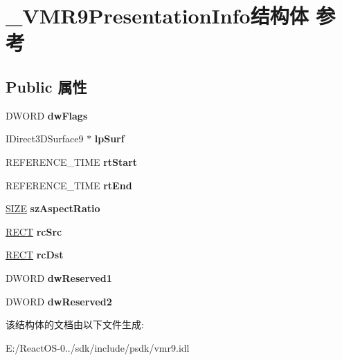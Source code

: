 \hypertarget{struct___v_m_r9_presentation_info}{}\section{\+\_\+\+V\+M\+R9\+Presentation\+Info结构体 参考}
\label{struct___v_m_r9_presentation_info}
\subsection*{Public 属性}
\begin{DoxyCompactItemize}
\item 
\mbox{\label{struct___v_m_r9_presentation_info_a3013903212bd955571eeb422e50d3838}} 
D\+W\+O\+RD {\bfseries dw\+Flags}
\item 
\mbox{\label{struct___v_m_r9_presentation_info_a66d688cfbe01a64ff6c0fa0869bcc4f0}} 
I\+Direct3\+D\+Surface9 $\ast$ {\bfseries lp\+Surf}
\item 
\mbox{\label{struct___v_m_r9_presentation_info_a2766b715a7501e07b859f94ede7e5e1b}} 
R\+E\+F\+E\+R\+E\+N\+C\+E\+\_\+\+T\+I\+ME {\bfseries rt\+Start}
\item 
\mbox{\label{struct___v_m_r9_presentation_info_a3cbd52416d10757725d0527991f9f1e8}} 
R\+E\+F\+E\+R\+E\+N\+C\+E\+\_\+\+T\+I\+ME {\bfseries rt\+End}
\item 
\mbox{\label{struct___v_m_r9_presentation_info_ae9f6baa50b111456ce427d85de374dc3}} 
\hyperlink{structtag_s_i_z_e}{S\+I\+ZE} {\bfseries sz\+Aspect\+Ratio}
\item 
\mbox{\label{struct___v_m_r9_presentation_info_aa14f5a6e5e76a5dd14e017f0517bcb00}} 
\hyperlink{structtag_r_e_c_t}{R\+E\+CT} {\bfseries rc\+Src}
\item 
\mbox{\label{struct___v_m_r9_presentation_info_ab95dce958740001dde39dae07484bf88}} 
\hyperlink{structtag_r_e_c_t}{R\+E\+CT} {\bfseries rc\+Dst}
\item 
\mbox{\label{struct___v_m_r9_presentation_info_aa781e190dbd8f5ad1893be466eca0314}} 
D\+W\+O\+RD {\bfseries dw\+Reserved1}
\item 
\mbox{\label{struct___v_m_r9_presentation_info_a865ae02c0139e76bf8fd014f551e0d58}} 
D\+W\+O\+RD {\bfseries dw\+Reserved2}
\end{DoxyCompactItemize}


该结构体的文档由以下文件生成\+:\begin{DoxyCompactItemize}
\item 
E\+:/\+React\+O\+S-\/0../sdk/include/psdk/vmr9.\+idl\end{DoxyCompactItemize}
